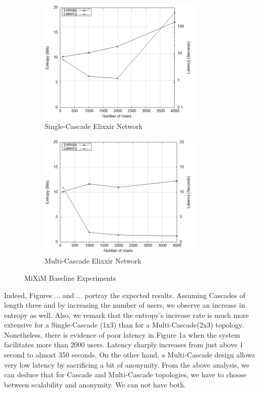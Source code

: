 \documentclass[logo,msc,cyber]{infthesis}   %
\begin{document}
\begin{figure}[h!]
    \centering
    \begin{subfigure}[b]{0.45\textwidth}
        \centering
        \includegraphics[height=6cm]{figures/simulator/1_a.png}
        \caption{Single-Cascade Elixxir Network}
        \label{fig:elixxir-cascade}
    \end{subfigure}
    \hfill
    \begin{subfigure}[b]{0.45\textwidth}
        \centering
        \includegraphics[height=6cm]{figures/simulator/1_b.png}
        \caption{Multi-Cascade Elixxir Network}
        \label{fig:elixxir-multi-cascade}
    \end{subfigure}
       \caption{MiXiM Baseline Experiments}
       \label{fig:elixxir}
 \end{figure}


 Indeed, Figures ... and ... portray the expected results. Assuming Cascades of
 length three and by increasing the number of users, we observe an increase in
 entropy as well. Also, we remark that the entropy's increase rate is much more
 extensive for a Single-Cascade (1x3) than for a Multi-Cascade(2x3) topology.
 Nonetheless, there is evidence of poor latency in Figure 1a when the system
 facilitates more than 2000 users. Latency sharply increases from just above 1
 second to almost 350 seconds. On the other hand, a Multi-Cascade design allows
 very low latency by sacrificing a bit of anonymity. From the above analysis, we
 can deduce that for Cascade and Multi-Cascade topologies, we have to choose
 between scalability and anonymity. We can not have both.
\end{document}
